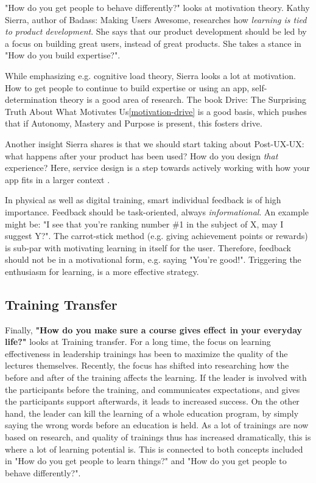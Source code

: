 "How do you get people to behave differently?" looks at motivation theory. Kathy Sierra, author of Badass: Making Users Awesome, researches how \textit{learning is tied to product development}. She says that our product development should be led by a focus on building great users, instead of great products. She takes a stance in "How do you build expertise?".

While emphasizing e.g. cognitive load theory, Sierra looks a lot at motivation. How to get people to continue to build expertise or using an app, self-determination theory is a good area of research. The book Drive: The Surprising Truth About What Motivates Us\ref{motivation-drive} is a good basis, which pushes that if Autonomy, Mastery and Purpose is present, this fosters drive.

Another insight Sierra shares is that we should start taking about Post-UX-UX: what happens after your product has been used? How do you design \textit{that} experience? Here, service design is a step towards actively working with how your app fits in a larger context .

In physical as well as digital training, smart individual feedback is of high importance. Feedback should be task-oriented, always \textit{informational}. An example might be: "I see that you're ranking number \#1 in the subject of X, may I suggest Y?". The carrot-stick method (e.g. giving achievement points or rewards) is sub-par with motivating learning in itself for the user. Therefore, feedback should not be in a motivational form, e.g. saying "You're good!". Triggering the enthusiasm for learning, is a more effective strategy.



\subsection{Training Transfer}

Finally, \textbf{"How do you make sure a course gives effect in your everyday life?"} looks at Training transfer. For a long time, the focus on learning effectiveness in leadership trainings has been to maximize the quality of the lectures themselves. Recently, the focus has shifted into researching how the before and after of the training affects the learning. If the leader is involved with the participants before the training, and communicates expectations, and gives the participants support afterwards, it leads to increased success. On the other hand, the leader can kill the learning of a whole education program, by simply saying the wrong words before an education is held. As a lot of trainings are now based on research, and quality of trainings thus has increased dramatically, this is where a lot of learning potential is. This is connected to both concepts included in "How do you get people to learn things?" and "How do you get people to behave differently?". \\

